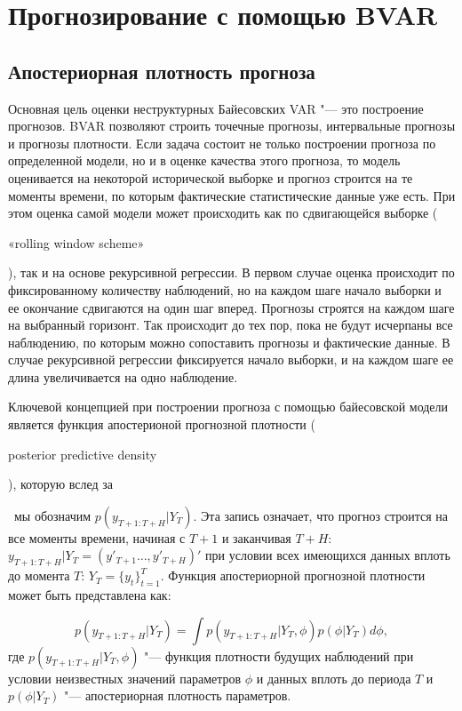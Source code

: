 \documentclass[11pt]{article} %
\newcommand{\eng}[1]{\begin{otherlanguage}{english}#1\end{otherlanguage}}
\begin{document}
\section{Прогнозирование с помощью BVAR}

\subsection{Апостериорная плотность прогноза}
Основная цель оценки неструктурных Байесовских VAR "--- это построение прогнозов. BVAR позволяют строить точечные прогнозы, интервальные прогнозы и  прогнозы  плотности. Если задача состоит не только построении прогноза по определенной модели, но и в оценке качества этого прогноза, то модель оценивается на некоторой исторической выборке и прогноз строится на те моменты времени, по которым фактические статистические данные уже есть. При этом оценка самой модели может происходить как по сдвигающейся выборке (\eng{«rolling window scheme»}), так и на основе рекурсивной регрессии. В первом случае оценка происходит по фиксированному количеству наблюдений, но на каждом шаге начало выборки и ее окончание сдвигаются на один шаг вперед. Прогнозы строятся на каждом шаге на выбранный горизонт.  Так происходит до тех пор, пока не будут исчерпаны все наблюдению, по которым можно сопоставить прогнозы и фактические данные. В случае рекурсивной регрессии фиксируется начало выборки, и на каждом шаге ее длина увеличивается на одно наблюдение.

Ключевой концепцией при построении прогноза с помощью байесовской модели является функция апостерионой прогнозной плотности (\eng{posterior predictive density}), которую вслед за \eng{\cite{karlsson_2012}}~мы обозначим $p(y_{T+1:T+H}|Y_{T})$. Эта запись означает, что прогноз строится на все моменты времени, начиная с $T+1$ и заканчивая $T+H$: $y_{T+1:T+H}|Y_{T}=(y'_{T+1}\ldots, y'_{T+H} )'$ при условии всех имеющихся данных вплоть до момента $T$: $Y_T=\lbrace y_t\rbrace _{t=1}^{T}$. Функция апостериорной прогнозной плотности может быть представлена как:

\begin{equation}\label{predictive_density}
p(y_{T+1:T+H}|Y_{T})=\int p(y_{T+1:T+H}|Y_{T},\phi) p(\phi |Y_T) d\phi,
\end{equation}
где $p(y_{T+1:T+H}|Y_{T},\phi)$ "--- функция плотности будущих наблюдений при условии неизвестных значений параметров $\phi$ и данных вплоть до периода $T$ и $p(\phi |Y_T)$ "--- апостериорная плотность параметров.
\end{document}
